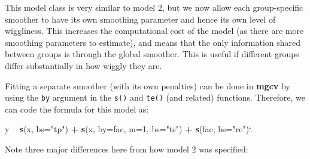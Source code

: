 \documentclass[12pt]{article}
\newenvironment{Shaded}{\begin{snugshade}}{\end{snugshade}}
\newcommand{\KeywordTok}[1]{\textcolor[rgb]{0.13,0.29,0.53}{\textbf{#1}}}
\newcommand{\DataTypeTok}[1]{\textcolor[rgb]{0.13,0.29,0.53}{#1}}
\newcommand{\DecValTok}[1]{\textcolor[rgb]{0.00,0.00,0.81}{#1}}
\newcommand{\StringTok}[1]{\textcolor[rgb]{0.31,0.60,0.02}{#1}}
\newcommand{\OperatorTok}[1]{\textcolor[rgb]{0.81,0.36,0.00}{\textbf{#1}}}
\newcommand{\NormalTok}[1]{#1}
\begin{document}
This model class is very similar to model 2, but we now allow each
group-specific smoother to have its own smoothing parameter and hence
its own level of wiggliness. This increases the computational cost of
the model (as there are more smoothing parameters to estimate), and
means that the only information shared between groups is through the
global smoother. This is useful if different groups differ substantially
in how wiggly they are.

Fitting a separate smoother (with its own penalties) can be done in
\textbf{mgcv} by using the \texttt{by} argument in the \texttt{s()} and
\texttt{te()} (and related) functions. Therefore, we can code the
formula for this model as:

\begin{Shaded}
\begin{Highlighting}[]
\NormalTok{y }\OperatorTok{~}\StringTok{ }\KeywordTok{s}\NormalTok{(x, }\DataTypeTok{bs=}\StringTok{"tp"}\NormalTok{) }\OperatorTok{+}\StringTok{ }\KeywordTok{s}\NormalTok{(x, }\DataTypeTok{by=}\NormalTok{fac, }\DataTypeTok{m=}\DecValTok{1}\NormalTok{, }\DataTypeTok{bs=}\StringTok{"ts"}\NormalTok{) }\OperatorTok{+}\StringTok{ }\KeywordTok{s}\NormalTok{(fac, }\DataTypeTok{bs=}\StringTok{"re"}\NormalTok{)}\StringTok{`}\DataTypeTok{.}
\end{Highlighting}
\end{Shaded}

Note three major differences here from how model 2 was specified:
\end{document}

